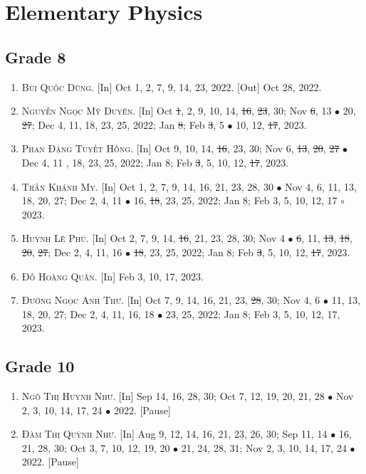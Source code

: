 \documentclass{article}
\numberwithin{equation}{section}
\begin{document}

\section{Elementary Physics}

\subsection{Grade 8}

\begin{enumerate}
	\item \textsc{Bùi Quốc Dũng.} \textsf{[In]} Oct 1, 2, 7, 9, 14, 23, 2022. \textsf{[Out]} Oct 28, 2022.
	\item \textsc{Nguyễn Ngọc Mỹ Duyên.} \textsf{[In]} Oct \st{1}, 2, 9, 10, 14, \st{16}, \st{23}, 30; Nov \st{6}, 13 $\bullet$ 20, \st{27}; Dec 4, 11, 18, 23, 25, 2022; Jan \st{8}; Feb \st{3}, 5 $\bullet$ 10, 12, \st{17}, 2023.
	\item \textsc{Phan Đặng Tuyết Hồng.} \textsf{[In]} Oct 9, 10, 14, \st{16}, 23, 30; Nov 6, \st{13}, \st{20}, \st{27} $\bullet$ Dec 4, 11 , 18, 23, 25, 2022; Jan 8; Feb \st{3}, 5, 10, 12, \st{17}, 2023.
	\item \textsc{Trần Khánh My.} \textsf{[In]} Oct 1, 2, 7, 9, 14, 16, 21, 23, 28, 30 $\bullet$ Nov 4, 6, 11, 13, 18, 20, 27; Dec 2, 4, 11 $\bullet$ 16, \st{18}, 23, 25, 2022; Jan 8; Feb 3, 5, 10, 12, 17 $\circ$ 2023.
	\item \textsc{Huỳnh Lê Phú.} \textsf{[In]} Oct 2, 7, 9, 14, \st{16}, 21, 23, 28, 30; Nov 4 $\bullet$ \st{6}, 11, \st{13}, \st{18}, \st{20}, \st{27}; Dec 2, 4, 11, 16 $\bullet$ \st{18}, 23, 25, 2022; Jan 8; Feb \st{3}, 5, 10, 12, \st{17}, 2023.
	\item \textsc{Đỗ Hoàng Quân.} \textsf{[In]} Feb 3, 10, 17, 2023.
	\item \textsc{Đường Ngọc Anh Thư.} \textsf{[In]} Oct 7, 9, 14, 16, 21, 23, \st{28}, 30; Nov 4, 6 $\bullet$ 11, 13, 18, 20, 27; Dec 2, 4, 11, 16, 18 $\bullet$ 23, 25, 2022; Jan 8; Feb 3, 5, 10, 12, 17, 2023.
\end{enumerate}

\subsection{Grade 10}

\begin{enumerate}
	\item \textsc{Ngô Thị Huỳnh Như.} \textsf{[In]} Sep 14, 16, 28, 30; Oct 7, 12, 19, 20, 21, 28 $\bullet$ Nov 2, 3, 10, 14, 17, 24 $\bullet$ 2022. \textsf{[Pause]}
	\item \textsc{Đàm Thị Quỳnh Như.} \textsf{[In]} Aug 9, 12, 14, 16, 21, 23, 26, 30; Sep 11, 14 $\bullet$ 16, 21, 28, 30; Oct 3, 7, 10, 12, 19, 20 $\bullet$ 21, 24, 28, 31; Nov 2, 3, 10, 14, 17, 24 $\bullet$ 2022. \textsf{[Pause]}
\end{enumerate}
\end{document}
